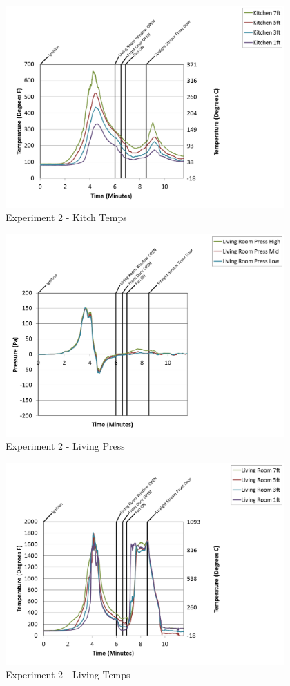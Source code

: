 \documentclass{article}
\begin{document}
\begin{appendices}
\begin{figure}[h!]
	\centering
	\includegraphics[height=3.05in]{0_Images/Results_Charts/Exp_2_Charts/KitchTemps.png}
	\caption{Experiment 2 - Kitch Temps}
\end{figure}

\clearpage

\begin{figure}[h!]
	\centering
	\includegraphics[height=3.05in]{0_Images/Results_Charts/Exp_2_Charts/LivingPress.png}
	\caption{Experiment 2 - Living Press}
\end{figure}


\begin{figure}[h!]
	\centering
	\includegraphics[height=3.05in]{0_Images/Results_Charts/Exp_2_Charts/LivingTemps.png}
	\caption{Experiment 2 - Living Temps}
\end{figure}


\end{appendices}
\end{document}
